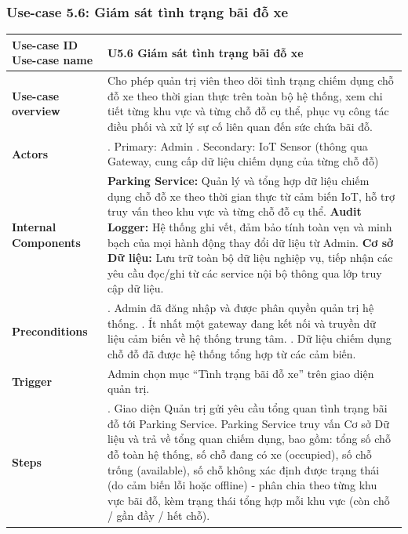 \newpage

\subsubsection{Use-case 5.6: Giám sát tình trạng bãi đỗ xe}
\vspace{0.5cm}
\noindent
{\small
\renewcommand{\arraystretch}{0.95}
\begin{longtable}{|>{\raggedright\arraybackslash}p{4cm}|>{\raggedright\arraybackslash}p{11.5cm}|}
\hline
\textbf{Use-case ID} \newline \textbf{Use-case name} & U5.6 \newline \textbf{Giám sát tình trạng bãi đỗ xe} \\ \hline
\endhead
\textbf{Use-case overview} & Cho phép quản trị viên theo dõi tình trạng chiếm dụng chỗ đỗ xe theo thời gian thực trên toàn bộ hệ thống, xem chi tiết từng khu vực và từng chỗ đỗ cụ thể, phục vụ công tác điều phối và xử lý sự cố liên quan đến sức chứa bãi đỗ. \\ \hline
\textbf{Actors} & 1. Primary: Admin \newline 2. Secondary: IoT Sensor (thông qua Gateway, cung cấp dữ liệu chiếm dụng của từng chỗ đỗ) \\ \hline
\textbf{Internal Components} &
\textbf{Parking Service:} Quản lý và tổng hợp dữ liệu chiếm dụng chỗ đỗ xe theo thời gian thực từ cảm biến IoT, hỗ trợ truy vấn theo khu vực và từng chỗ đỗ cụ thể. \newline
\textbf{Audit Logger:} Hệ thống ghi vết, đảm bảo tính toàn vẹn và minh bạch của mọi hành động thay đổi dữ liệu từ Admin. \newline
\textbf{Cơ sở Dữ liệu:} Lưu trữ toàn bộ dữ liệu nghiệp vụ, tiếp nhận các yêu cầu đọc/ghi từ các service nội bộ thông qua lớp truy cập dữ liệu. \\ \hline
\textbf{Preconditions} &
1. Admin đã đăng nhập và được phân quyền quản trị hệ thống. \newline
2. Ít nhất một gateway đang kết nối và truyền dữ liệu cảm biến về hệ thống trung tâm. \newline
3. Dữ liệu chiếm dụng chỗ đỗ đã được hệ thống tổng hợp từ các cảm biến. \\ \hline
\textbf{Trigger} & Admin chọn mục ``Tình trạng bãi đỗ xe'' trên giao diện quản trị. \\ \hline
\textbf{Steps} &
1. Giao diện Quản trị gửi yêu cầu tổng quan tình trạng bãi đỗ tới Parking Service. Parking Service truy vấn Cơ sở Dữ liệu và trả về tổng quan chiếm dụng, bao gồm: tổng số chỗ đỗ toàn hệ thống, số chỗ đang có xe (occupied), số chỗ trống (available), số chỗ không xác định được trạng thái (do cảm biến lỗi hoặc offline) - phân chia theo từng khu vực bãi đỗ, kèm trạng thái tổng hợp mỗi khu vực (còn chỗ / gần đầy / hết chỗ). \newline

\end{longtable}}

